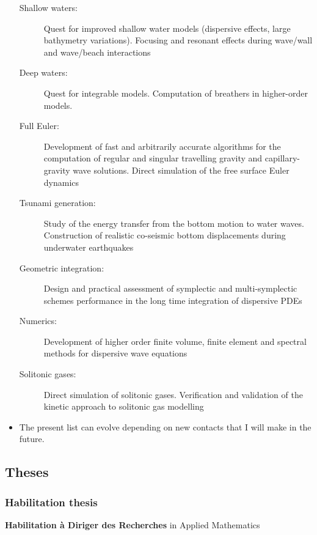 \documentclass[final, a4paper, oneside, 12pt]{article}
\numberwithin{equation}{section}
\begin{document}
\begin{itemize}
\begin{description}
    \item[Shallow waters:] Quest for improved shallow water models (dispersive effects, large bathymetry variations). Focusing and resonant effects during wave/wall and wave/beach interactions
    \item[Deep waters:] Quest for integrable models. Computation of breathers in higher-order models.
    \item[Full Euler:] Development of fast and arbitrarily accurate algorithms for the computation of regular and singular travelling gravity and capillary-gravity wave solutions. Direct simulation of the free surface Euler dynamics
    \item[Tsunami generation:] Study of the energy transfer from the bottom motion to water waves. Construction of realistic co-seismic bottom displacements during underwater earthquakes
    \item[Geometric integration:] Design and practical assessment of symplectic and multi-symplectic schemes performance in the long time integration of dispersive PDEs
    \item[Numerics:] Development of higher order finite volume, finite element and spectral methods for dispersive wave equations
    \item[Solitonic gases:] Direct simulation of solitonic gases. Verification and validation of the kinetic approach to solitonic gas modelling
    
  \end{description}

  \item The present list can evolve depending on new contacts that I will make in the future.
  
\end{itemize}


\subsection{Theses}

\subsubsection{Habilitation thesis}

\textbf{Habilitation \`a Diriger des Recherches} in Applied Mathematics

\vspace{1em}
\end{document}

